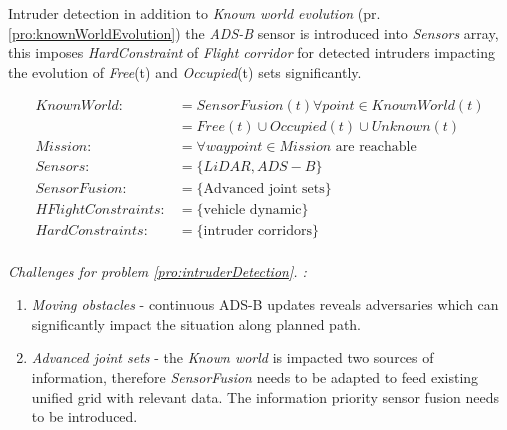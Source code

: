 \begin{problem}{Intruder detection}\label{pro:intruderDetection}
    in addition to \emph{Known world evolution} (pr.\ref{pro:knownWorldEvolution}) the \emph{ADS-B} sensor is introduced into \emph{Sensors} array, this imposes \emph{HardConstraint} of \emph{Flight corridor} for detected intruders impacting the evolution of \emph{Free}(t) and \emph{Occupied}(t) sets significantly.
    
    \begin{equation}\label{eq:intruderDetectionProblemdefinition}
        \begin{aligned}
            KnownWorld:&= SensorFusion(t)\forall point\in KnownWorld(t)\\
                       &=Free(t) \cup Occupied(t) \cup Unknown(t)\\
            Mission:&= \forall waypoint\in Mission \text{ are reachable}\\
            Sensors:&= \{LiDAR,ADS-B\}\\
            SensorFusion:&= \{\text{Advanced joint sets}\}\\
            HFlightConstraints:&=\{\text{vehicle dynamic}\}\\
            HardConstraints:&=\{\text{intruder corridors}\}\\
        \end{aligned}
    \end{equation}
    
    \ifproblemchallenge
    \noindent \emph{Challenges for problem  \ref{pro:intruderDetection}. :}
    \begin{enumerate}
        \item \emph{Moving obstacles} - continuous ADS-B updates reveals adversaries which can significantly impact the situation along planned path.
        \item \emph{Advanced joint sets} - the \emph{Known world} is impacted two sources of information, therefore \emph{SensorFusion} needs to be adapted to feed existing unified grid with relevant data. The information priority sensor fusion needs to be introduced. 
    \end{enumerate}
    \fi
\end{problem}

